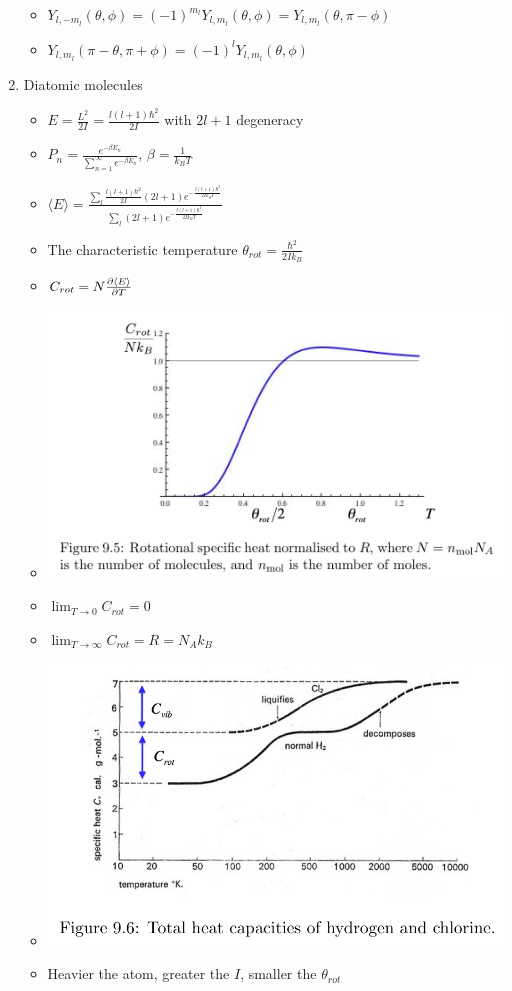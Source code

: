 \documentclass{article}
\theoremstyle{remark}
\theoremstyle{remark}
\begin{document}
\begin{enumerate}
\begin{itemize}
        \item $Y_{l,-m_l}(\theta,\phi)=(-1)^{m_l}Y_{l,m_l}(\theta,\phi)=Y_{l,m_l}(\theta,\pi-\phi)$
        \item $Y_{l,m_l}(\pi-\theta,\pi+\phi)=(-1)^l Y_{l,m_l}(\theta,\phi)$
    \end{itemize}
    \item Diatomic molecules\begin{itemize}
        \item $E=\frac{L^2}{2I} = \frac{l(l+1)\hbar^2}{2I}$ with $2l+1$ degeneracy
        \item $P_n = \frac{e^{-\beta E_n}}{\sum_{n=1}^\infty e^{-\beta E_n}}$, $\beta=\frac{1}{k_B T}$
        \item $\langle E\rangle = \frac{\sum_{l}\frac{l(l+1)\hbar^2}{2I}(2l+1)e^{-\frac{l(l+1)\hbar^2}{2Ik_B T}}}{\sum_l (2l+1)e^{-\frac{l(l+1)\hbar^2}{2Ik_B T}}}$
        \item The characteristic temperature $\theta_{rot}=\frac{\hbar^2}{2Ik_B}$
        \item $C_{rot}=N\pdv{\langle E\rangle}{T}$
        \item \includegraphics[width=0.6\linewidth]{C_rot vs T.png}
        \item $\lim_{T\rightarrow 0}C_{rot} = 0$
        \item $\lim_{T\rightarrow \infty}C_{rot} = R = N_A k_B$
        \item \includegraphics[width=0.6\linewidth]{effect of C_rot, C_vib.png}
        \item Heavier the atom, greater the $I$, smaller the $\theta_{rot}$

\end{itemize}
\end{enumerate}
\end{document}
